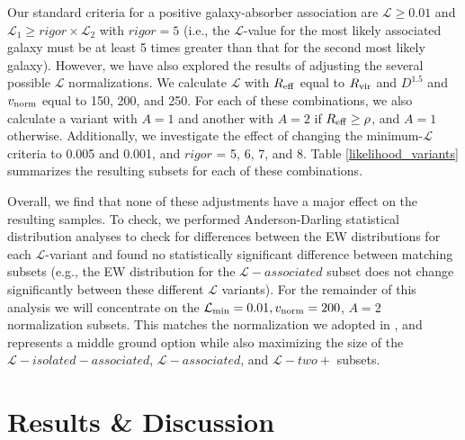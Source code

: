 Our standard criteria for a positive galaxy-absorber association are $\mathcal{L} \geq 0.01$ and $\mathcal{L}_1 \geq rigor \times \mathcal{L}_2$ with $rigor =5$ (i.e., the $\mathcal{L}$-value for the most likely associated galaxy must be at least 5 times greater than that for the second most likely galaxy). However, we have also explored the results of adjusting the several possible $\mathcal{L}$ normalizations. We calculate $\mathcal{L}$ with $R_{\rm eff}$ equal to $R_{\rm vir}$ and $D^{1.5}$ and $v_{\rm norm}$ equal to 150, 200, and 250. For each of these combinations, we also calculate a variant with $A =1$ and another with $A = 2$ if $R_{\rm eff} \ge \rho$, and $A=1$ otherwise. Additionally, we investigate the effect of changing the minimum-$\mathcal{L}$ criteria to 0.005 and 0.001, and $rigor$ = 5, 6, 7, and 8. Table \ref{likelihood_variants} summarizes the resulting subsets for each of these combinations. 


Overall, we find that none of these adjustments have a major effect on the resulting samples. To check, we performed Anderson-Darling statistical distribution analyses to check for differences between the EW distributions for each $\mathcal{L}$-variant and found no statistically significant difference between matching subsets (e.g., the EW distribution for the $\mathcal{L}-associated$ subset does not change significantly between these different $\mathcal{L}$ variants). For the remainder of this analysis we will concentrate on the $\mathcal{L}_{\rm min} = 0.01, v_{\rm norm} = 200$, $A = 2$ normalization subsets. This matches the normalization we adopted in \cite{french2017}, and represents a middle ground option while also maximizing the size of the $\mathcal{L}-isolated-associated$, $\mathcal{L}-associated$, and $\mathcal{L}-two+$ subsets.








\section{Results \& Discussion}
